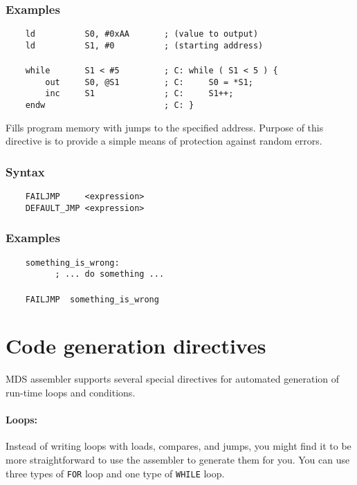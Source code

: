    \subsubsection{Examples}
        \verb'    ld          S0, #0xAA       ; (value to output)'\\
        \verb'    ld          S1, #0          ; (starting address)'\\
        \verb''\\
        \verb'    while       S1 < #5         ; C: while ( S1 < 5 ) {'\\
        \verb'        out     S0, @S1         ; C:     S0 = *S1;'\\
        \verb'        inc     S1              ; C:     S1++;'\\
        \verb'    endw                        ; C: }'

    Fills program memory with jumps to the specified address. Purpose of this directive is to provide a simple means of protection against random errors.

    \subsubsection{Syntax}
        \verb'    FAILJMP     <expression>'\\
        \verb'    DEFAULT_JMP <expression>'

    \subsubsection{Examples}
        \verb'    something_is_wrong:'\\
        \verb'          ; ... do something ...'\\
        \verb''\\
        \verb'    FAILJMP  something_is_wrong'

\clearpage
\section{Code generation directives}
    MDS assembler supports several special directives for automated generation of run-time loops and conditions.

    \paragraph{Loops:} Instead of writing loops with loads, compares, and jumps, you might find it to be more straightforward to use the assembler to generate them for you. You can use three types of \texttt{FOR} loop and one type of \texttt{WHILE} loop.

